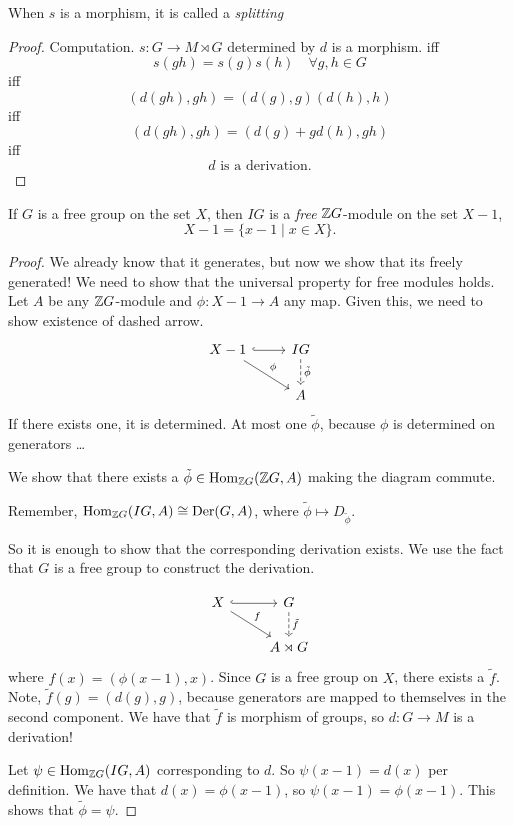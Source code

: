 \begin{remark}
    When $s$ is a morphism, it is called a \emph{splitting}
\end{remark}
\begin{proof}
    Computation.
    $s: G \to  M \rtimes G$ determined by $d$ is a morphism.
    iff 
     \[
         s(gh) = s(g) s(h) \quad \forall g, h \in G
    \] 
    iff
    \[
        (d(gh),gh) = (d(g),g)(d(h),h)
    \] 
    iff
    \[
        (d(gh), gh) = (d(g) + g d(h), gh)
    \] 
    iff
    \[
    d \text{ is a derivation}
    .\] 
\end{proof}
\begin{lemma}[6.4.8]
    If $G$ is a free group on the set $X$, then $IG$ is a \emph{free}  $\mathbb{Z} G$-module on the set $X - 1$,
    \[
    X-1 = \{x -1  \mid  x \in X\} 
    .\] 
\end{lemma}
\begin{proof}
    We already know that it generates, but now we show that its freely generated!
    We need to show that the universal property for free modules holds.
    Let $A$ be any  $\mathbb{Z} G$-module and $\phi: X -1 \to  A$ any map.
    Given this, we need to show existence of dashed arrow.
    \[
        \begin{tikzcd}
            X-1 \arrow[dr, "\phi"] \arrow[r, "", hook]& IG \arrow[d, "\tilde{\phi}", dashed]\\
                                   & A
        \end{tikzcd}
    \]
    If there exists one, it is determined.
    At most one $\tilde{\phi}$, because $\phi$ is determined on generators \ldots

    We show that there exists a $\tilde{\phi} \in  \operatorname{Hom}_{\mathbb{Z} G}(\mathbb{Z} G, A)$ making the diagram commute.

    Remember, $\operatorname{Hom}_{\mathbb{Z} G}(IG, A) \cong \operatorname{Der}(G, A)$, where $\tilde{\phi}\mapsto D_{\tilde{\phi}}$.

    So it is enough to show that the corresponding derivation exists.
    We use the fact that $G$ is a free  group to construct the derivation.

     \[
        \begin{tikzcd}
            X \arrow[r, "", hook] \arrow[dr, "f"]& G \arrow[d, "\tilde{f}", dashed]\\
                                                & A \rtimes G
        \end{tikzcd}
    \]
    where $f(x) = (\phi(x-1),x)$.
    Since  $G$ is a free group on  $X$, there exists a  $\tilde{f}$.
    Note, $\tilde{f}(g) =  (d(g), g)$, because generators are mapped to themselves in the second component.
    We have that $\tilde{f}$ is morphism of groups, so $d:G \to M$ is a derivation!

    Let $\psi \in  \operatorname{Hom}_{\mathbb{Z} G}(IG, A)$ corresponding to $d$.
    So  $\psi(x-1) = d(x)$ per definition.
    We have that  $d(x) = \phi(x-1)$, so  $\psi(x-1) = \phi(x-1)$.
    This shows that  $\tilde{\phi} = \psi$.
\end{proof}

